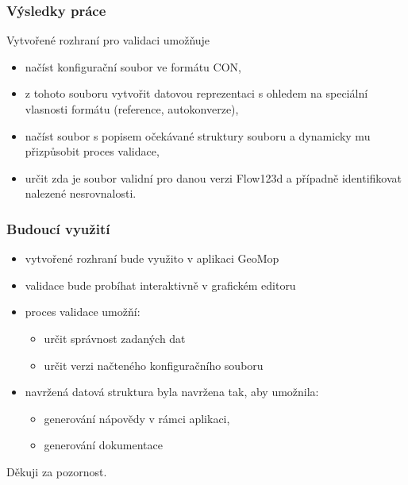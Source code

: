\documentclass{beamer}
\begin{document}
\begin{frame}
	\frametitle{Výsledky práce}
	Vytvořené rozhraní pro validaci umožňuje
	\begin{itemize}
		\item načíst konfigurační soubor ve formátu CON,
		\item z tohoto souboru vytvořit datovou reprezentaci s ohledem na
		speciální vlasnosti formátu (reference, autokonverze),
		\item načíst soubor s popisem očekávané struktury souboru a dynamicky mu přizpůsobit proces validace,
		\item určit zda je soubor validní pro danou verzi Flow123d a případně identifikovat nalezené nesrovnalosti.
	\end{itemize}
\end{frame}

\begin{frame}
	\frametitle{Budoucí využití}
	\begin{itemize}
		\item vytvořené rozhraní bude využito v aplikaci GeoMop
		\item validace bude probíhat interaktivně v grafickém editoru
		\item proces validace umožňí:
			\begin{itemize}
				\item určit správnost zadaných dat
				\item určit verzi načteného konfiguračního souboru
			\end{itemize}
		\item navržená datová struktura byla navržena tak, aby umožnila:
			\begin{itemize}
				\item generování nápovědy v rámci aplikaci,
				\item generování dokumentace
			\end{itemize}
	\end{itemize}
\end{frame}

\begin{frame}{}{}
\begin{center}
\huge Děkuji za pozornost.
\end{center}
\end{frame}
\end{document}
